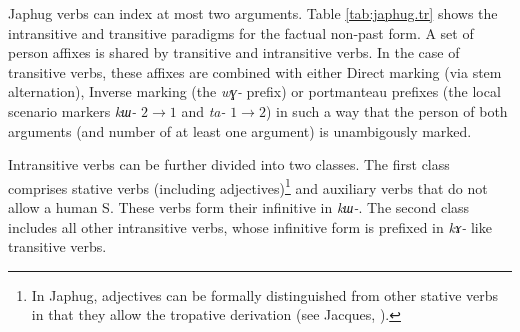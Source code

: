 \documentclass[oneside,a4paper,11pt]{article}
\newcommand{\ipa}[1]{{\phon\textit{\mbox{#1}}}} %
\begin{document}
Japhug verbs can index at most two arguments. Table \ref{tab:japhug.tr} shows the intransitive and transitive paradigms for the factual non-past form. A set of person affixes is shared by transitive and intransitive verbs. In the case of transitive verbs, these affixes are combined with either Direct marking (via stem alternation), Inverse marking (the \ipa{wɣ-} prefix) or portmanteau prefixes (the local scenario markers \ipa{kɯ-} $2\rightarrow1$ and \ipa{ta-} $1\rightarrow2$) in such a way that the person of both arguments (and number of at least one argument) is unambigously marked.

Intransitive verbs can be further divided into two classes. The first class comprises stative verbs (including adjectives)\footnote{In Japhug, adjectives can be formally distinguished from other stative verbs in that they allow the tropative derivation (see Jacques, \citeyear{jacques13tropative}).} and auxiliary verbs that do not allow a human S. These verbs form their infinitive in \ipa{kɯ-}. The second class includes all other intransitive verbs, whose infinitive form is prefixed in \ipa{kɤ-} like transitive verbs.
\end{document}
